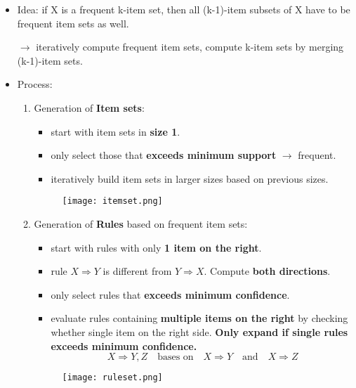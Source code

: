 \begin{itemize}
	\item Idea: if X is a frequent k-item set, then all (k-1)-item subsets of X have to be frequent item sets as well.
	
	$\rightarrow$ iteratively compute frequent item sets, compute k-item sets by merging (k-1)-item sets.
	
	\item Process: 
	\begin{enumerate}[label= \protect \circled{\arabic*} ]
		\item Generation of \textbf{Item sets}: 
		\begin{itemize}
			\item start with item sets in \textbf{size 1}.
			\item only select those that \textbf{exceeds minimum support} $\rightarrow$ frequent.
			\item iteratively build item sets in larger sizes based on previous sizes. 
		\end{itemize}
	\begin{figure}[H]
		\centering
		\texttt{[image: itemset.png]}
	\end{figure}
		\item Generation of \textbf{Rules} based on frequent item sets:
		\begin{itemize}
			\item start with rules with only \textbf{1 item on the right}. 
			\item rule $X \Rightarrow Y$ is different from $Y \Rightarrow X$. Compute \textbf{both directions}. 
			\item only select rules that \textbf{exceeds minimum confidence}. 
			\item evaluate rules containing \textbf{multiple items on the right} by checking whether single item on the right side. \textbf{Only expand if single rules exceeds minimum confidence.}
			$$X \Rightarrow Y, Z \quad \text{bases on} \quad X \Rightarrow Y \quad \text{and} \quad X \Rightarrow Z$$ 
		\end{itemize}
	\begin{figure}[H]
		\centering
		\texttt{[image: ruleset.png]}
	\end{figure}
	\end{enumerate}
\end{itemize}

